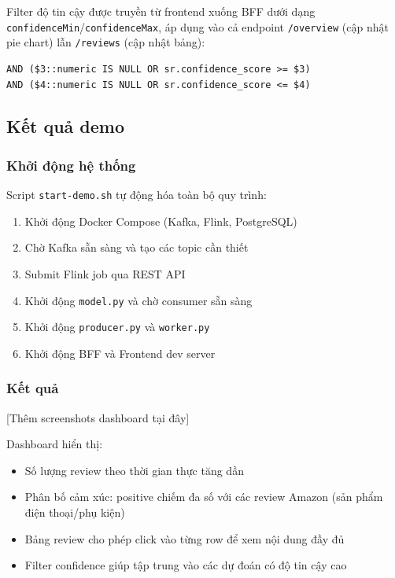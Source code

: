 Filter độ tin cậy được truyền từ frontend xuống BFF dưới dạng \texttt{confidenceMin}/\texttt{confidenceMax}, áp dụng vào cả endpoint \texttt{/overview} (cập nhật pie chart) lẫn \texttt{/reviews} (cập nhật bảng):

\begin{verbatim}
AND ($3::numeric IS NULL OR sr.confidence_score >= $3)
AND ($4::numeric IS NULL OR sr.confidence_score <= $4)
\end{verbatim}

\subsection{Kết quả demo}

\subsubsection{Khởi động hệ thống}

Script \texttt{start-demo.sh} tự động hóa toàn bộ quy trình:
\begin{enumerate}
    \item Khởi động Docker Compose (Kafka, Flink, PostgreSQL)
    \item Chờ Kafka sẵn sàng và tạo các topic cần thiết
    \item Submit Flink job qua REST API
    \item Khởi động \texttt{model.py} và chờ consumer sẵn sàng
    \item Khởi động \texttt{producer.py} và \texttt{worker.py}
    \item Khởi động BFF và Frontend dev server
\end{enumerate}

\subsubsection{Kết quả}

[Thêm screenshots dashboard tại đây]

Dashboard hiển thị:
\begin{itemize}
    \item Số lượng review theo thời gian thực tăng dần
    \item Phân bố cảm xúc: positive chiếm đa số với các review Amazon (sản phẩm điện thoại/phụ kiện)
    \item Bảng review cho phép click vào từng row để xem nội dung đầy đủ
    \item Filter confidence giúp tập trung vào các dự đoán có độ tin cậy cao
\end{itemize}
